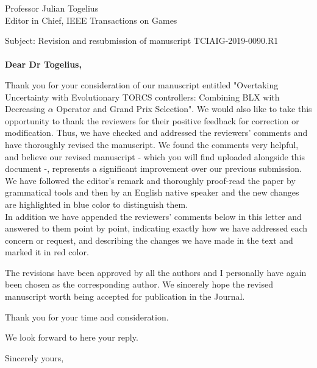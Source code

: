 \documentclass[10pt]{letter} %
\begin{document}

\begin{letter}{Professor Julian Togelius \\ Editor in Chief, IEEE Transactions on Games} %

\opening{Subject: Revision and resubmission of manuscript TCIAIG-2019-0090.R1\\
	\\	
\textbf{Dear Dr Togelius,}}

Thank you for your consideration of our manuscript entitled "Overtaking Uncertainty with Evolutionary TORCS controllers: Combining BLX with Decreasing $\alpha$ Operator and Grand Prix Selection". 
We would also like to take this opportunity to thank the reviewers for their positive feedback for correction or modification. Thus, we have checked and addressed the reviewers' comments and have thoroughly revised the manuscript. We found the comments very helpful, and believe our revised manuscript - which you will find uploaded alongside this document -, represents a significant improvement over our previous submission. \\
We have followed the editor's remark and thoroughly proof-read the paper by grammatical tools and then by an English native speaker and the new changes are highlighted in blue color to distinguish them.\\
In addition we have appended the reviewers' comments below in this letter and answered to them point by point, indicating exactly how we have addressed each concern or request, and describing the changes we have made in the text and marked it in red color. 

The revisions have been approved by all the authors and I personally have again been chosen as the corresponding author. 
We sincerely hope the revised manuscript worth being accepted for publication in the Journal.

Thank you for your time and consideration.

We look forward to here your reply.

\vspace{2\parskip} %
\closing{Sincerely yours,}
\vspace{2\parskip} %


\end{letter}
\end{document}
